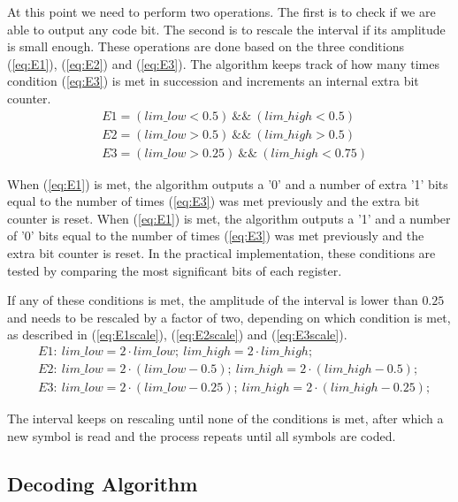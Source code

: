 \begin{refsection}
At this point we need to perform two operations. The first is to check if we are able to output any code bit. The second is to rescale the interval if its amplitude is small enough. These operations are done based on the three conditions (\ref{eq:E1}), (\ref{eq:E2}) and (\ref{eq:E3}). The algorithm keeps track of how many times condition (\ref{eq:E3}) is met in succession and increments an internal extra bit counter.
\begin{eqnarray}
\label{eq:E1} &E1 = (lim\_low < 0.5) \  \&\& \ (lim\_high < 0.5) \\
\label{eq:E2} &E2 = (lim\_low > 0.5) \ \&\& \ (lim\_high > 0.5) \\
\label{eq:E3} &E3 = (lim\_low > 0.25) \ \&\& \ (lim\_high < 0.75)
\end{eqnarray}

When (\ref{eq:E1}) is met, the algorithm outputs a '0' and a number of extra '1' bits equal to the number of times (\ref{eq:E3}) was met previously and the extra bit counter is reset. When (\ref{eq:E1}) is met, the algorithm outputs a '1' and a number of '0' bits equal to the number of times (\ref{eq:E3}) was met previously and the extra bit counter is reset. In the practical implementation, these conditions are tested by comparing the most significant bits of each register.

If any of these conditions is met, the amplitude of the interval is lower than $0.25$ and needs to be rescaled by a factor of two, depending on which condition is met, as described in (\ref{eq:E1scale}), (\ref{eq:E2scale}) and (\ref{eq:E3scale}).
\begin{eqnarray}
\label{eq:E1scale} &E1:\ lim\_low = 2 \cdot lim\_low;\ lim\_high = 2 \cdot lim\_high;\\
\label{eq:E2scale} &E2:\ lim\_low = 2 \cdot (lim\_low-0.5);\ lim\_high = 2 \cdot (lim\_high-0.5); \\
\label{eq:E3scale} &E3:\ lim\_low = 2 \cdot (lim\_low-0.25);\ lim\_high = 2 \cdot (lim\_high-0.25);
\end{eqnarray}

The interval keeps on rescaling until none of the conditions is met, after which a new symbol is read and the process repeats until all symbols are coded.



\subsection{Decoding Algorithm}


\end{refsection}
